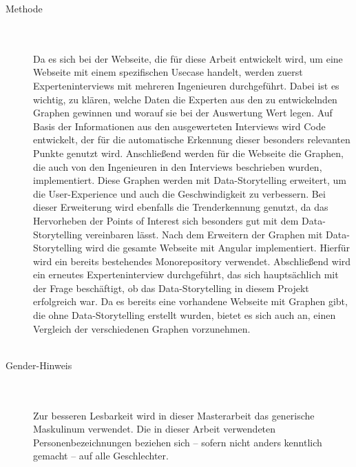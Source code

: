 \begin{description}
\item[Methode]\hfill \\\\
Da es sich bei der Webseite, die für diese Arbeit entwickelt wird, um eine Webseite mit einem spezifischen Usecase handelt, werden zuerst Experteninterviews mit mehreren Ingenieuren durchgeführt. Dabei ist es  wichtig, zu klären, welche Daten die Experten aus den zu entwickelnden Graphen gewinnen und worauf sie bei der Auswertung Wert legen. Auf Basis der Informationen aus den ausgewerteten Interviews wird Code entwickelt, der für die automatische Erkennung dieser besonders relevanten Punkte genutzt wird. Anschließend werden für die Webseite die Graphen, die auch von den Ingenieuren in den Interviews beschrieben wurden, implementiert. Diese Graphen werden mit Data-Storytelling erweitert, um die User-Experience und auch die Geschwindigkeit zu verbessern. Bei dieser Erweiterung wird ebenfalls die Trenderkennung genutzt, da das Hervorheben der Points of Interest sich besonders gut mit dem Data-Storytelling vereinbaren lässt. Nach dem Erweitern der Graphen mit Data-Storytelling wird die gesamte Webseite mit Angular implementiert. Hierfür wird ein bereits bestehendes Monorepository verwendet. Abschließend wird ein erneutes Experteninterview durchgeführt, das sich hauptsächlich mit der Frage beschäftigt, ob das Data-Storytelling in diesem Projekt erfolgreich war. Da es bereits eine vorhandene Webseite mit Graphen gibt, die ohne Data-Storytelling erstellt wurden, bietet es sich auch an, einen Vergleich der verschiedenen Graphen vorzunehmen.\\\\
\item[Gender-Hinweis]\hfill \\\\
Zur besseren Lesbarkeit wird in dieser Masterarbeit das generische Maskulinum verwendet. Die in dieser Arbeit verwendeten Personenbezeichnungen beziehen sich – sofern nicht anders kenntlich gemacht – auf alle Geschlechter.
\end{description}